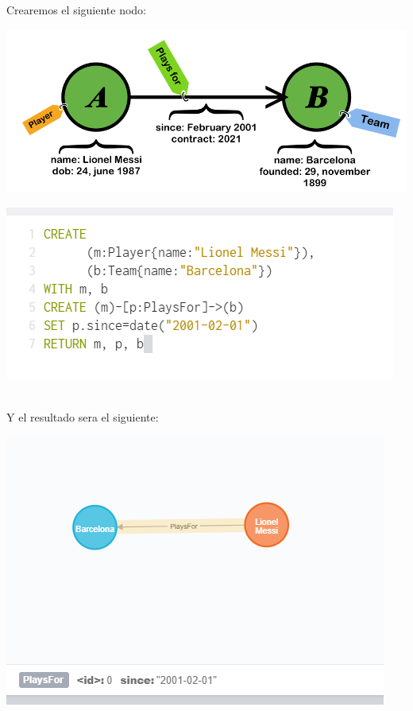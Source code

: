 \documentclass[twoside,onecolumn]{article}
\begin{document}
\begin{flushright}
\begin{itemize}
\begin{center}
\begin{center}
\end{center}	
\end{center}	
\textbf{}\\
\textbf{}\\Crearemos el siguiente nodo:
\begin{center}
\includegraphics[scale=0.4]{Imagenes/neo4jn}
\end{center}	

\begin{center}
\includegraphics[scale=0.7]{Imagenes/neo4j5}
\end{center}	
\textbf{}\\ Y el resultado sera el siguiente:
\begin{center}
\includegraphics[scale=0.7]{Imagenes/neo4j7}
\end{center}	


\end{itemize}
\end{flushright}
\end{document}
